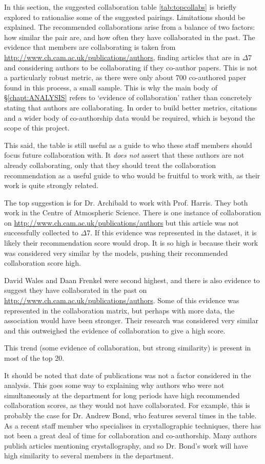\label{sec:collabtable}
In this section, the suggested collaboration table \ref{tab:topcollabs} is briefly explored to rationalise some of the suggested pairings.
Limitations should be explained. 
The recommended collaborations arise from a balance of two factors: how similar the pair are, and how often they have collaborated in the past. The evidence that members are collaborating is taken from \url{http://www.ch.cam.ac.uk/publications/authors}, finding articles that are in $\Delta7$ and considering authors to be collaborating if they co-author papers. This is not a particularly robust metric, as there were only about 700 co-authored paper found in this process, a small sample. This is why the main body of \S\ref{chapt:ANALYSIS} refers to `evidence of collaboration' rather than concretely stating that authors are collaborating. In order to build better metrics, citations and a wider body of co-authorship data would be required, which is beyond the scope of this project.

This said, the table is still useful as a guide to who these staff members should focus future collaboration with. It \emph{does not} assert that these authors are not already collaborating, only that they should treat the collaboration recommendation as a useful guide to who would be fruitful to work with, as their work is quite strongly related.

The top suggestion is for Dr. Archibald to work with Prof. Harris. They both work in the Centre of Atmospheric Science. There is one instance of collaboration on \url{http://www.ch.cam.ac.uk/publications/authors} but this article was not successfully collected to $\Delta7$. If this evidence was represented in the dataset, it is likely their recommendation score would drop. It is so high is because their work was considered very similar by the models, pushing their recommended collaboration score high.

David Wales and Daan Frenkel were second highest, and there is also evidence to suggest they have  collaborated in the past on \url{http://www.ch.cam.ac.uk/publications/authors}. Some of this evidence was represented in the collaboration matrix, but perhaps with more data, the association would have been stronger. Their research was considered very similar and this outweighed the evidence of collaboration to give a high score.

This trend (some evidence of collaboration, but strong similarity) is present in most of the top 20. 

It should be noted that date of publications was not a factor considered in the analysis. This goes some way to explaining why authors who were not simultaneously at the department for long periods have high recommended collaboration scores, as they would not have collaborated. For example, this is probably the case for Dr. Andrew Bond, who features several times in the table. As a recent staff member who specialises in crystallographic techniques, there has not been a great deal of time for collaboration and co-authorship. Many authors publish articles mentioning crystallography, and so Dr. Bond's work will have high similarity to several members in the department.
